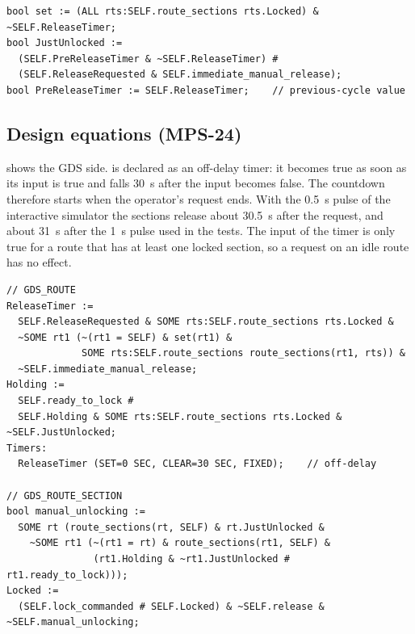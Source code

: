 \documentclass[a4paper,12pt]{article}
\newcommand{\code}[1]{\texttt{\detokenize{#1}}}
\newenvironment{keeptogether}{\par\noindent\begin{minipage}{\linewidth}}{\end{minipage}\par\smallskip}
\begin{document}
\begin{keeptogether}
\begin{lstlisting}[caption={Additions to \code{OM/ROUTE.tm} (defined states).},label={lst:om}]
bool set := (ALL rts:SELF.route_sections rts.Locked) & ~SELF.ReleaseTimer;
bool JustUnlocked :=
  (SELF.PreReleaseTimer & ~SELF.ReleaseTimer) #
  (SELF.ReleaseRequested & SELF.immediate_manual_release);
bool PreReleaseTimer := SELF.ReleaseTimer;    // previous-cycle value
\end{lstlisting}
\end{keeptogether}

\subsection{Design equations (MPS-24)}
\label{subsec:mr_gds}

 shows the GDS side. \code{ReleaseTimer} is declared as an off-delay timer: it becomes true as soon as its input is true and falls 30~s after the input becomes false. The countdown therefore starts when the operator's request ends. With the 0.5~s pulse of the interactive simulator the sections release about 30.5~s after the request, and about 31~s after the 1~s pulse used in the tests. The input of the timer is only true for a route that has at least one locked section, so a request on an idle route has no effect.

\begin{keeptogether}
\begin{lstlisting}[caption={Manual release in \code{GDS_ROUTE} and \code{GDS_ROUTE_SECTION}.},label={lst:gds_mr}]
// GDS_ROUTE
ReleaseTimer :=
  SELF.ReleaseRequested & SOME rts:SELF.route_sections rts.Locked &
  ~SOME rt1 (~(rt1 = SELF) & set(rt1) &
             SOME rts:SELF.route_sections route_sections(rt1, rts)) &
  ~SELF.immediate_manual_release;
Holding :=
  SELF.ready_to_lock #
  SELF.Holding & SOME rts:SELF.route_sections rts.Locked & ~SELF.JustUnlocked;
Timers:
  ReleaseTimer (SET=0 SEC, CLEAR=30 SEC, FIXED);    // off-delay

// GDS_ROUTE_SECTION
bool manual_unlocking :=
  SOME rt (route_sections(rt, SELF) & rt.JustUnlocked &
    ~SOME rt1 (~(rt1 = rt) & route_sections(rt1, SELF) &
               (rt1.Holding & ~rt1.JustUnlocked # rt1.ready_to_lock)));
Locked :=
  (SELF.lock_commanded # SELF.Locked) & ~SELF.release & ~SELF.manual_unlocking;
\end{lstlisting}
\end{keeptogether}
\end{document}
